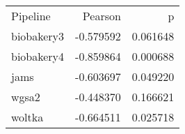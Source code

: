 \begin{tabular}{lrr}
Pipeline & Pearson & p \\
biobakery3 & -0.579592 & 0.061648 \\
biobakery4 & -0.859864 & 0.000688 \\
jams & -0.603697 & 0.049220 \\
wgsa2 & -0.448370 & 0.166621 \\
woltka & -0.664511 & 0.025718 \\
\end{tabular}
